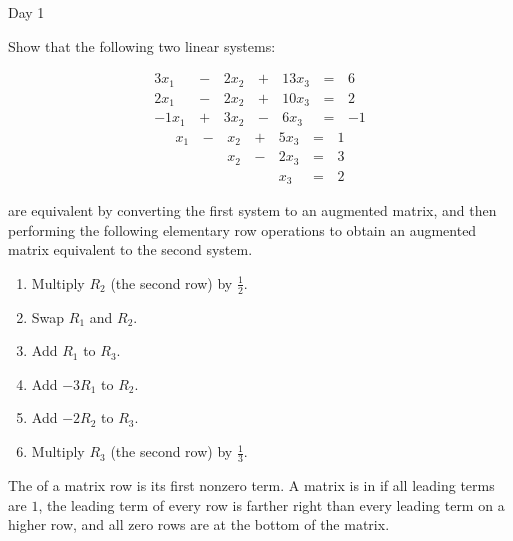 \begin{applicationActivities}{Day 1}
\begin{activity}
  Show that the following two linear systems:
  \begin{multicols}{2}\noindent
    \begin{alignat*}{4}
      3x_1 &\,-\,& 2x_2 &\,+\,& 13x_3 &\,=\,& 6 \\
      2x_1 &\,-\,& 2x_2 &\,+\,& 10x_3 &\,=\,& 2 \\
     -1x_1 &\,+\,& 3x_2 &\,-\,&  6x_3 &\,=\,& -1
    \end{alignat*}
    \begin{alignat*}{4}
       x_1 &\,-\,&  x_2  &\,+\,&  5x_3 &\,=\,& 1 \\
           &\, \,&  x_2 &\,-\,&  2x_3 &\,=\,& 3 \\
           &\, \,&      &\, \,&   x_3 &\,=\,& 2
    \end{alignat*}
  \end{multicols}
  are equivalent by converting the first system to an augmented matrix,
  and then performing the following elementary row operations to obtain
  an augmented matrix equivalent to the second system.
  \begin{multicols}{2}\noindent
  \begin{enumerate}
    \item Multiply \(R_2\) (the second row) by \(\frac{1}{2}\).
    \item Swap \(R_1\) and \(R_2\).
    \item Add \(R_1\) to \(R_3\).
    \item Add \(-3R_1\) to \(R_2\).
    \item Add \(-2R_2\) to \(R_3\).
    \item Multiply \(R_3\) (the second row) by \(\frac{1}{3}\).
  \end{enumerate}
  \end{multicols}
\end{activity}

\begin{definition}
  The  of a matrix row is its first nonzero term.
  A matrix is in  if all leading terms are \(1\),
  the leading term of every row
  is farther right than every leading term on a higher row, and all zero
  rows are at the bottom of the matrix.
\end{definition}


\end{applicationActivities}
